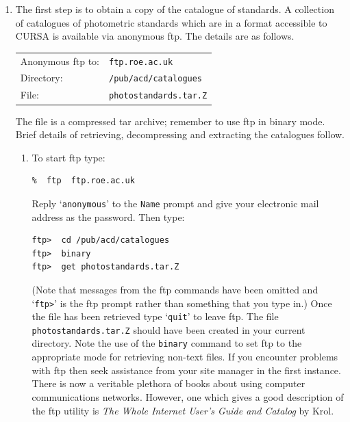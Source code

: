 \documentclass[twoside,11pt]{article}
\begin{document}
\begin{enumerate}

  \item The first step is to obtain a copy of the catalogue of
   standards.  A collection of catalogues of photometric standards
   which are in a format accessible to CURSA is available via anonymous
   ftp.  The details are as follows.

  \begin{tabular}{ll}
   Anonymous ftp to: & {\tt ftp.roe.ac.uk}        \\
   Directory:        & {\tt /pub/acd/catalogues}  \\
   File:             & {\tt photostandards.tar.Z} \\
  \end{tabular}

   The file is a compressed tar archive; remember to use ftp in binary
   mode.  Brief details of retrieving, decompressing and extracting
   the catalogues follow.

  \begin{enumerate}

    \item To start ftp type:

\begin{verbatim}
%  ftp  ftp.roe.ac.uk
\end{verbatim}

     Reply `{\tt anonymous}' to the {\tt Name} prompt and give your
     electronic mail address as the password.  Then type:

\begin{verbatim}
ftp>  cd /pub/acd/catalogues
ftp>  binary
ftp>  get photostandards.tar.Z
\end{verbatim}

     (Note that messages from the ftp commands have been omitted and
     `\verb-ftp>-' is the ftp prompt rather than something that you
     type in.)  Once the file has been retrieved type `{\tt quit}' to
     leave ftp.  The file {\tt photostandards.tar.Z} should have been
     created in your current directory.  Note the use of the {\tt binary}
     command to set ftp to the appropriate mode for retrieving non-text
     files.  If you encounter problems with ftp then seek assistance from
     your site manager in the first instance.  There is now a veritable
     plethora of books about using computer communications networks.
     However, one which gives a good description of the ftp utility is
     {\it The Whole Internet User's Guide and Catalog} by Krol\cite{KROL93}.


\end{enumerate}
\end{enumerate}
\end{document}
